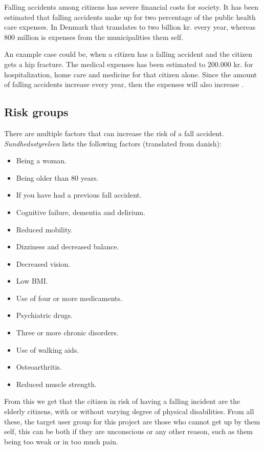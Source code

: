 Falling accidents among citizens has severe financial costs for society. It has been estimated that falling accidents make up for two percentage of the public health care expenses. In Denmark that translates to two billion kr. every year, whereas 800 million is expenses from the municipalities them self.

An example case could be, when a citizen has a falling accident and the citizen gets a hip fracture. The medical expenses has been estimated to 200.000 kr. for hospitalization, home care and medicine for that citizen alone. Since the amount of falling accidents increase every year, then the expenses will also increase \cite{MagasinetSundhed:Pris}.

\subsection{Risk groups}
There are multiple factors that can increase the risk of a fall accident. \textit{Sundhedsstyrelsen} \cite{FaldArtikel} lists the following factors (translated from danish):

\begin{itemize}
    \item Being a woman.
    \item Being older than 80 years.
    \item If you have had a previous fall accident.
    \item Cognitive failure, dementia and delirium.
    \item Reduced mobility.
    \item Dizziness and decreased balance.
    \item Decreased vision.
    \item Low BMI.
    \item Use of four or more medicaments.
    \item Psychiatric drugs.
    \item Three or more chronic disorders.
    \item Use of walking aids.
    \item Osteoarthritis.
    \item Reduced muscle strength.
\end{itemize}

From this we get that the citizen in risk of having a falling incident are the elderly citizens, with or without varying degree of physical disabilities. From all these, the target user group for this project are those who cannot get up by them self, this can be both if they are unconscious or any other reason, such as them being too weak or in too much pain.

